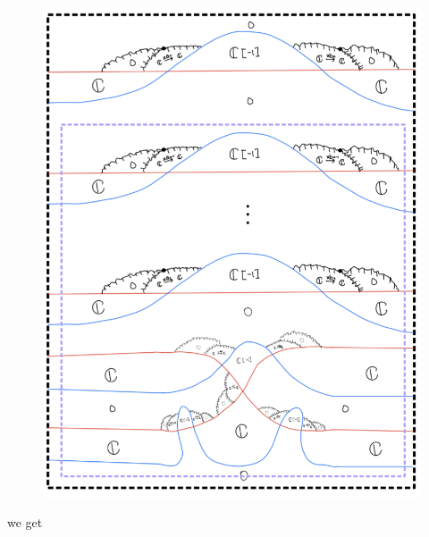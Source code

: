 \begin{enumerate}[label = (\roman*)]
\begin{enumerate}[label = (Case \arabic*)]
\begin{enumerate}[label = (Step \arabic*)]
\begin{figure}[H]
    \centering
    \includegraphics[scale = 0.95]{diagrams/cobord_gen/9.png}
    \caption{}
    \label{fig:your-label}
\end{figure}
\pagebreak
we get


\end{enumerate}
\end{enumerate}
\end{enumerate}
